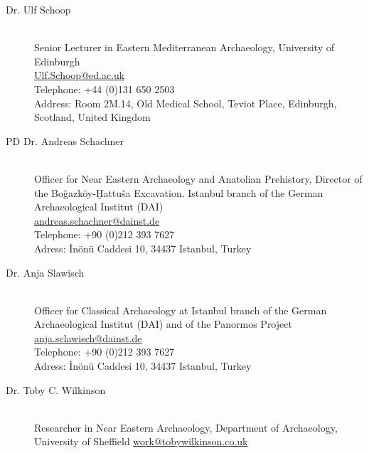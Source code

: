 \begin{multicols}{2}
\begin{description}
  \item[Dr. Ulf Schoop] \hfill \\ Senior Lecturer in  Eastern Mediterranean Archaeology, 
   University of Edinburgh \\
  \href{mailto:Ulf.Schoop@ed.ac.uk}{Ulf.Schoop@ed.ac.uk}\\
  Telephone: +44 (0)131 650 2503 \\
  Address: Room 2M.14, Old Medical School, Teviot Place, Edinburgh, Scotland,
  United Kingdom 

  \item[PD Dr. Andreas Schachner] \hfill \\ Officer for Near Eastern Archaeology and
  Anatolian  Prehistory, Director of the Boğazköy-Ḫattuša Excavation.
  Istanbul branch of the German Archaeological Institut (DAI) \\
  \href{mailto:andreas.schachner@dainst.de}{andreas.schachner@dainst.de}\\ 
  Telephone: +90 (0)212 393 7627\\
  Adress: İnönü Caddesi 10,  34437 Istanbul, Turkey

  
  \item[Dr. Anja Slawisch] \hfill \\ Officer for Classical Archaeology at Istanbul
    branch of the German Archaeological
  Institut (DAI) and of the Panormos Project\\
  \href{mailto:anja.slawisch@dainst.de}{anja.sclawisch@dainst.de} \\
  Telephone: +90 (0)212 393 7627 \\
  Adress: İnönü Caddesi 10,  34437 Istanbul, Turkey
  
  \item[Dr. Toby C. Wilkinson] \hfill \\ Researcher in Near Eastern Archaeology, 
    Department of Archaeology, University of Sheffield
  \href{mailto:work@tobywilkinson.co.uk}{work@tobywilkinson.co.uk} \\

\end{description}

\end{multicols}
